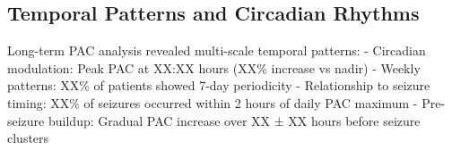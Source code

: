 \subsection{Temporal Patterns and Circadian Rhythms}

Long-term PAC analysis revealed multi-scale temporal patterns:
- Circadian modulation: Peak PAC at XX:XX hours (XX\% increase vs nadir)
- Weekly patterns: XX\% of patients showed 7-day periodicity
- Relationship to seizure timing: XX\% of seizures occurred within 2 hours of daily PAC maximum
- Pre-seizure buildup: Gradual PAC increase over XX ± XX hours before seizure clusters




\label{sec:results}

\label{sec:results}

